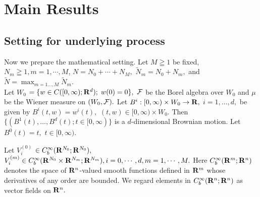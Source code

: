 \documentclass[12pt]{article}
\begin{document}
\section{Main Results}
\subsection{Setting for underlying process}
Now we prepare the mathematical setting. 
Let $M \geqq 1$ be fixed, ${N}_{m} \geqq 1, m=1, \cdots, M$, 
$N= N_0+ \cdots + N_M,$ $ \tilde{N}_m=N_0+N_m,$ and $\tilde{N}=\max_{m=1\ldots,M}\tilde{N}_m$.\\
Let $W_0$ $ = \{ w\in C([0,\infty );{\bf R}^d); \; w(0) = 0 \} ,$
${\cal F}$ be the Borel algebra over $W_0$ 
and $\mu$ be the Wiener measure on $(W_0,{\cal F}).$
Let $B^i:[0,\infty )\times W_0 \to {\bf R},$ $i=1,\ldots ,d,$ be given 
by $B^i(t,w) =w^i(t),$ $(t,w)\in [0,\infty )\times W_0.$
Then $ \{ (B^1(t), \dots ,B^d(t) ; t \in [0,\infty ) \}$ 
is a $d$-dimensional Brownian motion.
Let $B^0(t) = t,$ $t \in [0,\infty ).$

\noindent Let $V^{(0)}_i$ $ \in C^{\infty}_b({\bf R}^{{N}_0}; {\bf R}^{{N}_0}),$ 
$V^{(m)}_i \in C^{\infty}_b({\bf R}^{{N}_0}\times {\bf R}^{{N}_m};{\bf R}^{{N}_m}), i =0, \cdots, d, m=1, \cdots, M.$
Here $C^{\infty}_b({\bf R}^m;{\bf R}^n)$ denotes 
the space of ${\bf R}^n$-valued smooth functions defined 
in ${\bf R}^m$ whose derivatives of any order are bounded.
We regard elements in $C^{\infty}_b({\bf R}^n;{\bf R}^n)$ 
as vector fields on ${\bf R}^n.$
\end{document}

